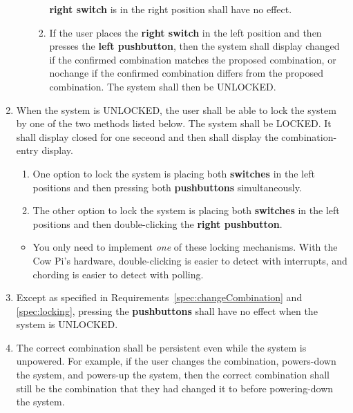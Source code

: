 \begin{enumerate}
\begin{enumerate}
\begin{enumerate}
            \textbf{right switch} is in the right position shall have no effect.
        \item If the user places the \textbf{right switch} in the left position
            and then presses the \textbf{left pushbutton}, then the system
            shall display {\dviiseg changed} if the confirmed
            combination matches the proposed combination, or {\dviiseg nochange}
            if the confirmed combination differs from the proposed
            combination. The system shall then be UNLOCKED.
        \end{enumerate}
    \end{enumerate}
\item \label{spec:locking} When the system is UNLOCKED, the user shall be able
    to lock the system by one of the two methods listed below. The system shall
    be LOCKED. It shall display {\dviiseg closed} for one seceond and then shall
    display the combination-entry display.
    \begin{enumerate}
    \item One option to lock the system is placing both \textbf{switches} in the
        left positions and then pressing both \textbf{pushbuttons}
        simultaneously.
    \item The other option to lock the system is placing both \textbf{switches}
        in the left positions and then double-clicking the \textbf{right
        pushbutton}.
    \end{enumerate}
    \begin{itemize}
    \item You only need to implement \textit{one} of these locking mechanisms.
        With the Cow Pi's hardware, double-clicking is easier to detect with
        interrupts, and chording is easier to detect with polling.
    \end{itemize}
\item Except as specified in Requirements~\ref{spec:changeCombination} and
    \ref{spec:locking}, pressing the \textbf{pushbuttons} shall have no effect
    when the system is UNLOCKED.
\item \label{spec:persistentCombination} The correct combination shall be
    persistent even while the system is unpowered. For example, if the user
    changes the combination, powers-down the system, and powers-up the system,
    then the correct combination shall still be the combination that they had
    changed it to before powering-down the system.
\end{enumerate}

